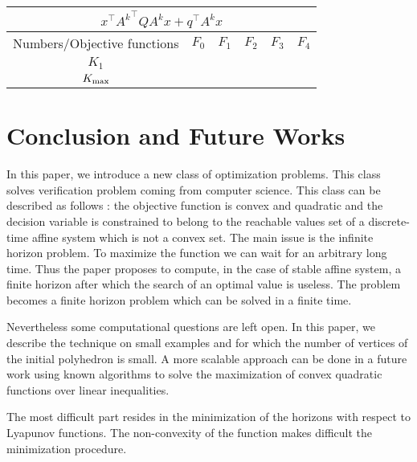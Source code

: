 \documentclass[10pt]{article}
\begin{document}
\begin{center}
\begin{tabular}{|c|c|c|c|c|c|}
\hline
\multicolumn{6}{|c|}{$x^\intercal {A^k}^\intercal Q A^k x+q^\intercal A^k x$}\\
\hline
Numbers/Objective functions & $F_0$ & $F_{1}$ & $F_{2}$ & $F_3$ & $F_4$ \\
\hline
$K_1$ & & & & & \\
\hline
 $K_{\rm max}$ & & & & & \\
\hline
\end{tabular}
\end{center}
\section{Conclusion and Future Works}
\label{conclusion}
In this paper, we introduce a new class of optimization problems. This class solves verification problem coming from computer science. This class can be described as follows : the objective function is convex and quadratic and the decision variable is constrained to belong to the reachable values set of a discrete-time affine system which is not a convex set. The main issue is the infinite horizon problem. To maximize the function we can wait for an arbitrary long time. Thus the paper proposes to compute, in the case of stable affine system, a finite horizon after which the search of an optimal value is useless. The problem becomes a finite horizon problem which can be solved in a finite time. 

Nevertheless some computational questions are left open. In this paper, we describe the technique on small examples and for which the number of vertices of the initial polyhedron is small. A more scalable approach can be done in a future work using known algorithms to solve the maximization of convex quadratic functions over linear inequalities. 

The most  difficult part resides in the minimization of the horizons with respect to Lyapunov functions. The non-convexity of the function makes difficult the minimization procedure.         

 
\end{document}
